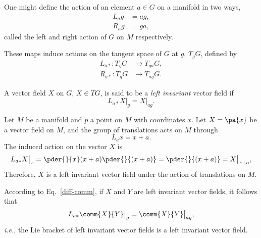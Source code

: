 One might define the action of an element $a \in G$ on a manifold in two ways,
\begin{equation}
  \begin{split}
    L_a g &= a g, \\
    R_a g &= g a,
  \end{split}
\end{equation}
called the left and right action of $G$ on $M$ respectively.

These maps induce actions on the tangent space of $G$ at $g$, $T_g G$, defined by
\begin{equation}
  \begin{split}
    L_{a*} : T_g G &\to T_{ga} G, \\
    R_{a*} : T_g G &\to T_{ag} G.
  \end{split}
\end{equation}

\begin{Def}
  A vector field $X$ on $G$, $X \in TG$, is said to be a \emph{left invariant} vector field if
  \begin{equation}
    L_{a*} X \bigr|_{g} = X \bigr|_{ag}.
  \end{equation}
\end{Def}

\begin{WEbox}[%
    frametitle={Left Invariant Vector Field},
    frametitlerule=true,
    frametitlealignment=\centering,
    frametitleaboveskip=10pt,]
  Let $M$ be a manifold and $p$ a point on $M$ with coordinates $x$. Let $X = \pa{x}$ be a vector field on $M$, and the group of translations acts on $M$ through 
  \begin{equation}
    L_a x = x + a.
  \end{equation}
  The induced action on the vector $X$ is
  \begin{equation}
    L_{a*} X \bigr|_x = \pder{}{x}(x + a) \pder{}{(x + a)} = \pder{}{(x + a)} = X \bigr|_{x+a},
  \end{equation}
  Therefore, $X$ is a left invariant vector field under the action of translations on $M$.
\end{WEbox}

According to Eq.~\eqref{diff-comm}, if $X$ and $Y$ are left invariant vector fields, it follows that
\begin{equation}
  L_{a*} \comm{X}{Y} \bigr|_{g} = \comm{X}{Y} \bigr|_{ag},
\end{equation}
\emph{i.e.}, the Lie bracket of left invariant vector fields is a left invariant vector field.
